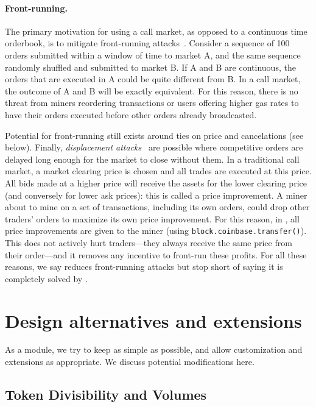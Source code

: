 \paragraph{Front-running.} The primary motivation for using a call market, as opposed to a continuous time orderbook, is to mitigate front-running attacks~\cite{clark2014decentralizing,eskandari2019sok,daian2019flash}. Consider a sequence of 100 orders submitted within a window of time to market A, and the same sequence randomly shuffled and submitted to market B. If A and B are continuous, the orders that are executed in A could be quite different from B. In a call market, the outcome of A and B will be exactly equivalent. For this reason, there is no threat from miners reordering transactions or users offering higher gas rates to have their orders executed before other orders already broadcasted. 

Potential for front-running still exists around ties on price and cancelations (see below). Finally, \textit{displacement attacks}~\cite{eskandari2019sok} are possible where competitive orders are delayed long enough for the market to close without them. In a traditional call market, a market clearing price is chosen and all trades are executed at this price. All bids made at a higher price will receive the assets for the lower clearing price (and conversely for lower ask prices): this is called a price improvement. A miner about to mine on a set of transactions, including its own orders, could drop other traders' orders to maximize its own price improvement. For this reason, in \cm, all price improvements are given to the miner (using \texttt{block.coinbase.transfer()}). This does not actively hurt traders---they always receive the same price from their order---and it removes any incentive to front-run these profits. For all these reasons, we say \cm reduces front-running attacks but stop short of saying it is completely solved by \cm. 



\section{Design alternatives and extensions}

As a module, we try to keep \cm as simple as possible, and allow customization and extensions as appropriate. We discuss potential modifications here.  

\subsection{Token Divisibility and Volumes} 


